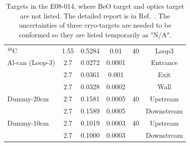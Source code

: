 \begin{table}[htbp]
\begin{tabular}{lccccc}
   $\mathrm{^{48}C}$&      1.55              & 0.5284        &     0.01               &40           &  Loop3    \\
   Al-can (Loop-3)  & 2.7                    & 0.0272        &     0.0001             &             &  Entrance \\
                    & 2.7                    & 0.0361        &     0.001             &              &  Exit     \\
                    & 2.7                    & 0.0328        &     0.0002             &             &  Wall     \\
   Dummy-20cm       &      2.7               & 0.1581        &     0.0005             &40           & Upstream  \\
                    &      2.7               & 0.1589        &     0.0005             &             & Downstream\\
   Dummy-10cm       &      2.7               & 0.1019        &     0.0003             &40           & Upstream  \\
                    &      2.7               & 0.1000        &     0.0003             &             & Downstream\\        
   \bottomrule
   \end{tabular}
  \caption[Targets in the E08-014]{\footnotesize{Targets in the E08-014, where BeO target and optics target are not listed. The detailed report is in Ref.~\cite{target_report}. The uncertainties of three cryo-targets are needed to be conformed so they are listed temporarily as "N/A". }}
  \label{target_table}
  \end{table}
  
